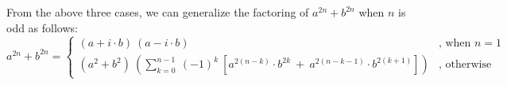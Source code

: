 \documentclass[12pt]{article}
\begin{document}
From the above three cases, we can generalize the factoring of $a^{2n}+b^{2n}$ when $n$ is odd as follows:
\[
a^{2n}+b^{2n} = \begin{cases} (a+i\cdot b)\ (a-i\cdot b) &\mbox{, when } n=1\\ \left( a^2+b^2 \right)\ \left( \sum_{k=0}^{n-1}\ (-1)^k\ \left[ a^{2(n-k)} \cdot b^{2k}\ +\ a^{2(n-k-1)}\cdot b^{2(k+1)} \right] \right) & \mbox{, otherwise} \end{cases}
\]
\end{document}
